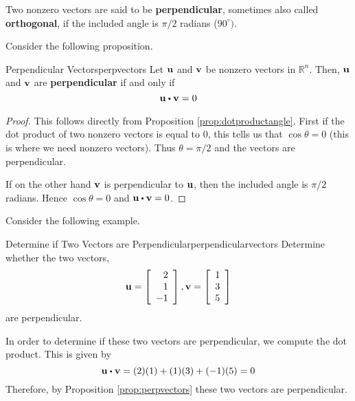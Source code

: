 Two nonzero  vectors are said to be \textbf{perpendicular},
 sometimes also called \textbf{orthogonal}, if
the included angle is $\pi /2$ radians ($90^{\circ }).$

Consider the following proposition.

\begin{proposition}{Perpendicular Vectors}{perpvectors}
Let ${\bf u}$ and ${\bf v}$ be nonzero vectors in $\mathbb{R}^n$. Then, 
${\bf u}$ and ${\bf v}$ are \textbf{perpendicular}  if and only if
\begin{equation*}
\vect{u}
\dotprod
\vect{v}
=
0
\end{equation*}
\end{proposition}

\begin{proof}
This follows directly from Proposition \ref{prop:dotproductangle}. First if the dot product of
two nonzero vectors is equal to $0$, this tells us that $\cos \theta
=0$ (this is where we need nonzero vectors). Thus $\theta = \pi /2$
and the vectors are perpendicular.

If on the other hand ${\bf v}$ is perpendicular to ${\bf u}$, then 
the included angle is $\pi /2$ radians. Hence $\cos \theta =0$ and 
$\vect{u} \dotprod \vect{v} = 0$.
\end{proof}

Consider the following example.

\begin{example}{Determine if Two Vectors are Perpendicular}{perpendicularvectors}
Determine whether the two vectors, 
\begin{equation*}
{\bf u}=
\left[
\begin{array}{r}
2 \\
1 \\
-1 
\end{array}
\right], 
{\bf v} 
=
\left[
\begin{array}{r}
1 \\
3 \\
5
\end{array}
\right]
\end{equation*}
 are perpendicular.
\end{example}

\begin{solution}
In order to determine if these two vectors are perpendicular, we compute the dot product.
This is given by
\begin{equation*}
\vect{u} \dotprod \vect{v}
=
(2)(1) + (1)(3) + (-1)(5)
=
0
\end{equation*}
Therefore, by Proposition \ref{prop:perpvectors} these two vectors are perpendicular.
\end{solution}